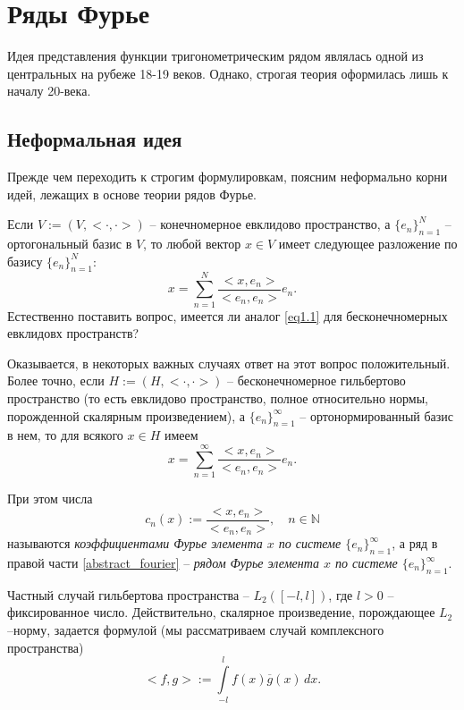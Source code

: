 
\section{Ряды Фурье}


Идея представления функции тригонометрическим рядом являлась одной из центральных на рубеже 18-19 веков. Однако, строгая теория оформилась лишь к началу 20-века.

\subsection{Неформальная идея}

Прежде чем переходить к строгим формулировкам, поясним неформально корни идей, лежащих в основе теории рядов Фурье.

Если $V:=(V,<\cdot,\cdot>)$ -- конечномерное евклидово пространство, а $\{e_{n}\}_{n=1}^{N}$ -- ортогональный базис в $V$, то любой вектор $x \in V$
имеет следующее разложение по базису $\{e_{n}\}_{n=1}^{N}$:
\begin{equation}
\label{eq1.1}
x=\sum\limits_{n=1}^{N} \frac{<x,e_{n}>}{<e_{n},e_{n}>}e_{n}.
\end{equation}
Естественно поставить вопрос, имеется ли аналог \eqref{eq1.1} для бесконечномерных евклидовх пространств?

Оказывается, в некоторых важных случаях ответ на этот вопрос положительный. Более точно, если $H:=(H,<\cdot,\cdot>)$ -- бесконечномерное гильбертово пространство (то есть евклидово пространство, полное относительно нормы, порожденной скалярным произведением), а $\{e_{n}\}_{n=1}^{\infty}$ -- ортонормированный базис в нем, то для всякого $x \in H$ имеем
\begin{equation}
\label{abstract_fourier}
x=\sum\limits_{n=1}^{\infty} \frac{<x,e_{n}>}{<e_{n},e_{n}>} e_{n}.
\end{equation}

При этом числа
\begin{equation}
\label{eqq.Fourier_coeff}
c_{n}(x):=\frac{<x,e_{n}>}{<e_{n},e_{n}>}, \quad n \in \mathbb{N}
\end{equation}
называются \textit{коэффициентами Фурье элемента $x$ по системе $\{e_{n}\}_{n=1}^{\infty}$}, а ряд в правой части \eqref{abstract_fourier} -- \textit{рядом Фурье
элемента $x$ по системе $\{e_{n}\}_{n=1}^{\infty}$}.

Частный случай гильбертова пространства -- $L_{2}([-l,l])$, где $l > 0$ -- фиксированное число. 
Действительно, скалярное произведение, порождающее $L_{2}$--норму, задается формулой (мы рассматриваем случай комплексного пространства)
$$
<f,g>:=\int\limits_{-l}^{l}f(x)\overline{g}(x)\,dx.
$$

